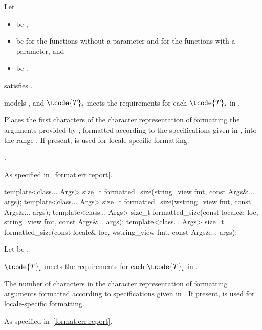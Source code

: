 \begin{itemdescr}
\pnum
Let
\begin{itemize}
\item {} be ,
\item {} be
 for the functions without a  parameter and
 for the functions with a  parameter, and
\item {} be .
\end{itemize}

\pnum
\constraints
{} satisfies .

\pnum
\expects
{} models , and
$\tcode{T}_i$
meets the  requirements
for each $\tcode{T}_i$ in .

\pnum
\effects
Places the first  characters of the character representation of
formatting the arguments provided by ,
formatted according to the specifications given in ,
into the range .
If present,  is used for locale-specific formatting.

\pnum
\returns
{}.

\pnum
\throws
As specified in~\ref{format.err.report}.
\end{itemdescr}

%
\begin{itemdecl}
template<class... Args>
  size_t formatted_size(string_view fmt, const Args&... args);
template<class... Args>
  size_t formatted_size(wstring_view fmt, const Args&... args);
template<class... Args>
  size_t formatted_size(const locale& loc, string_view fmt, const Args&... args);
template<class... Args>
  size_t formatted_size(const locale& loc, wstring_view fmt, const Args&... args);
\end{itemdecl}

\begin{itemdescr}
\pnum
Let  be .

\pnum
\expects
{}$\tcode{T}_i$
meets the  requirements
for each $\tcode{T}_i$ in .

\pnum
\returns
The number of characters in the character representation of
formatting arguments 
formatted according to specifications given in .
If present,  is used for locale-specific formatting.

\pnum
\throws
As specified in~\ref{format.err.report}.
\end{itemdescr}

